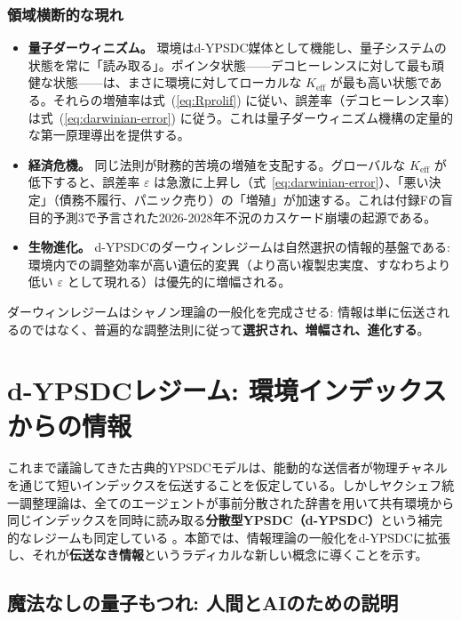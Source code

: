 \documentclass[12pt,a4paper]{article}
\theoremstyle{definition}
\theoremstyle{remark}
\begin{document}
	\subsubsection*{領域横断的な現れ}
	\begin{itemize}[leftmargin=*]
		\item \textbf{量子ダーウィニズム。} 環境はd-YPSDC媒体として機能し、量子システムの状態を常に「読み取る」。ポインタ状態——デコヒーレンスに対して最も頑健な状態——は、まさに環境に対してローカルな $K_{\mathrm{eff}}$ が最も高い状態である。それらの増殖率は式~(\ref{eq:Rprolif}) に従い、誤差率（デコヒーレンス率）は式~(\ref{eq:darwinian-error}) に従う。これは量子ダーウィニズム機構の定量的な第一原理導出を提供する。
		\item \textbf{経済危機。} 同じ法則が財務的苦境の増殖を支配する。グローバルな $K_{\mathrm{eff}}$ が低下すると、誤差率 $\varepsilon$ は急激に上昇し（式~\ref{eq:darwinian-error}）、「悪い決定」（債務不履行、パニック売り）の「増殖」が加速する。これは付録Fの盲目的予測3で予言された2026-2028年不況のカスケード崩壊の起源である。
		\item \textbf{生物進化。} d-YPSDCのダーウィンレジームは自然選択の情報的基盤である: 環境内での調整効率が高い遺伝的変異（より高い複製忠実度、すなわちより低い $\varepsilon$ として現れる）は優先的に増幅される。
	\end{itemize}
	
	ダーウィンレジームはシャノン理論の一般化を完成させる: 情報は単に伝送されるのではなく、普遍的な調整法則に従って\textbf{選択され、増幅され、進化する}。
	
	\section{d-YPSDCレジーム: 環境インデックスからの情報}
	\label{sec:d-ypsdc-info}
	
	これまで議論してきた古典的YPSDCモデルは、能動的な送信者が物理チャネルを通じて短いインデックスを伝送することを仮定している。しかしヤクシェフ統一調整理論は、全てのエージェントが事前分散された辞書を用いて共有環境から同じインデックスを同時に読み取る\textbf{分散型YPSDC（d-YPSDC）}という補完的なレジームも同定している \cite{Appendix_dYPSDC}。本節では、情報理論の一般化をd-YPSDCに拡張し、それが\textbf{伝送なき情報}というラディカルな新しい概念に導くことを示す。
	
	\subsection{魔法なしの量子もつれ: 人間とAIのための説明}
	
\end{document}
